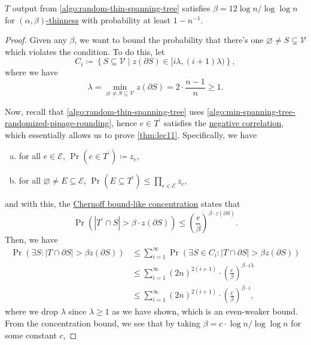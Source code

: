 \begin{lemma}\label{lma:lec12-2}
	\(T\) output from \autoref{algo:random-thin-spanning-tree} satisfies \(\beta = 12\log n / \log \log n\) for \hyperref[def:thin]{\((\alpha , \beta )\)-thinness} with probability at least \(1 - n^{-1} \).
\end{lemma}
\begin{proof}
	Given any \(\beta \), we want to bound the probability that there's one \(\varnothing \neq S \subsetneq \mathcal{V} \) which violates the condition. To do this, let
	\[
		C_i \coloneqq \left\{ S \subseteq \mathcal{V} \mid z(\partial S) \in [i \lambda , (i+1)\lambda ) \right\} ,
	\]
	where we have
	\[
		\lambda = \min _{\varnothing \neq S \subseteq \mathcal{V} }z(\partial S) = 2\cdot \frac{n-1}{n} \geq 1.
	\]

	Now, recall that \autoref{algo:random-thin-spanning-tree} uses \autoref{algo:min-spanning-tree-randomized-pipage-rounding}, hence \(e\in T^\prime \) satisfies the \hyperref[thm:negative-correlation]{negative correlation}, which essentially allows us to prove \autoref{thm:lec11}. Specifically, we have
	\begin{enumerate}[(a)]
		\item for all \(e\in \mathcal{E} \), \(\Pr(e\in T^\prime ) \coloneqq z_e\),
		\item for all \(\varnothing \neq E \subseteq \mathcal{E} \), \(\Pr(E \subseteq T^\prime) \leq \prod_{e\in \mathcal{E} } z_e\),
	\end{enumerate}
	and with this, the \hyperref[thm:lec11]{Chernoff bound-like concentration} states that
	\[
		\Pr(\left\vert T^\prime \cap S \right\vert > \beta \cdot z(\partial S)) \leq \left( \frac{e}{\beta } \right) ^{\beta \cdot z(\partial S)}.
	\]
	Then, we have
	\[
		\begin{split}
			\Pr(\exists S\colon \left\vert T \cap \partial S \right\vert > \beta z(\partial S))
			 & \leq \sum_{i=1} ^{\infty} \Pr(\exists S\in C_i \colon \left\vert T \cap \partial S \right\vert > \beta z(\partial S)) \\
			 & \leq \sum_{i=1}^{\infty} (2n)^{2(i+1)} \cdot \left( \frac{e}{\beta } \right) ^{\beta \cdot i\lambda}                  \\
			 & \leq \sum_{i=1}^{\infty} (2n)^{2(i+1)} \cdot \left( \frac{e}{\beta } \right) ^{\beta \cdot i},
		\end{split}
	\]
	where we drop \(\lambda\) since \(\lambda \geq 1\) as we have shown, which is an even-weaker bound. From the concentration bound, we see that by taking \(\beta = c\cdot \log n / \log \log n\) for some constant \(c\),

\end{proof}
